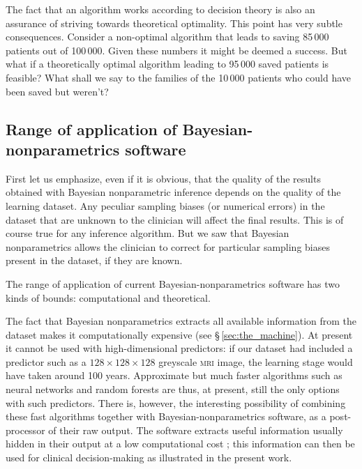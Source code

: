 \documentclass[a4paper,12pt,%
onecolumn,oneside,article,%
british%
]{memoir}
\theoremstyle{remark}
\theoremstyle{innote}
\renewcommand*{\|}[1][]{\nonscript\:#1\vert\nonscript\:\mathopen{}}
\newcommand*{\sect}{\S}%
\begin{document}
The fact that an algorithm works according to decision theory is also an assurance of striving towards theoretical optimality. This point has very subtle consequences. Consider a non-optimal algorithm that leads to saving 85\,000 patients out of 100\,000. Given these numbers it might be deemed a success. But what if a theoretically optimal algorithm leading to 95\,000 saved patients is feasible? What shall we say to the families of the 10\,000 patients who could have been saved but weren't?


\subsection{Range of application of Bayesian-nonparametrics software}
\label{sec:rangeLJM}

First let us emphasize, even if it is obvious, that the quality of the results obtained with Bayesian nonparametric inference depends on the quality of the learning dataset. Any peculiar sampling biases (or numerical errors) in the dataset that are unknown to the clinician will affect the final results. This is of course true for any inference algorithm. But we saw that Bayesian nonparametrics allows the clinician to correct for particular sampling biases present in the dataset, if they are known.

The range of application of current Bayesian-nonparametrics software has two kinds of bounds: computational and theoretical.

The fact that Bayesian nonparametrics extracts all available information from the dataset makes it computationally expensive (see \sect\,\ref{sec:the_machine}). At present it cannot be used with high-dimensional predictors: if our dataset had included a predictor such as a $128\times128\times128$ greyscale \textsc{mri} image, the learning stage would have taken around 100 years. Approximate but much faster algorithms such as neural networks and random forests are thus, at present, still the only options with such predictors. There is, however, the interesting possibility of combining these fast algorithms together with Bayesian-nonparametrics software, as a post-processor of their raw output. The software extracts useful information usually hidden in their output at a low computational cost \autocites{dyrlandetal2022b}; this information can then be used for clinical decision-making as illustrated in the present work.
\end{document}
